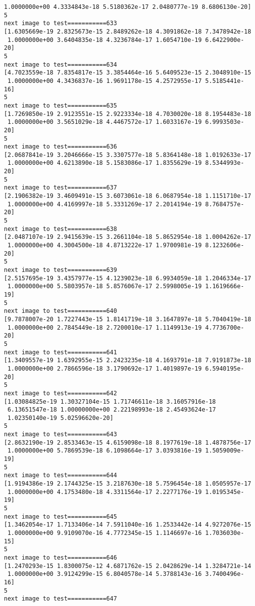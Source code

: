 \documentclass[11pt]{article}
\begin{document}
\begin{Verbatim}[commandchars=\\\{\}]
 1.0000000e+00 4.3334843e-18 5.5180362e-17 2.0480777e-19 8.6806130e-20]
5
next image to test===========633
[1.6305669e-19 2.8325673e-15 2.8489262e-18 4.3091862e-18 7.3478942e-18
 1.0000000e+00 3.6404835e-18 4.3236784e-17 1.6054710e-19 6.6422900e-20]
5
next image to test===========634
[4.7023559e-18 7.8354817e-15 3.3854464e-16 5.6409523e-15 2.3048910e-15
 1.0000000e+00 4.3436837e-16 1.9691178e-15 4.2572955e-17 5.5185441e-16]
5
next image to test===========635
[1.7269850e-19 2.9123551e-15 2.9223334e-18 4.7030020e-18 8.1954483e-18
 1.0000000e+00 3.5651029e-18 4.4467572e-17 1.6033167e-19 6.9993503e-20]
5
next image to test===========636
[2.0687841e-19 3.2046666e-15 3.3307577e-18 5.8364148e-18 1.0192633e-17
 1.0000000e+00 4.6213890e-18 5.1583086e-17 1.8355629e-19 8.5344993e-20]
5
next image to test===========637
[2.1906382e-19 3.4609491e-15 3.6073061e-18 6.0687954e-18 1.1151710e-17
 1.0000000e+00 4.4169997e-18 5.3331269e-17 2.2014194e-19 8.7684757e-20]
5
next image to test===========638
[2.0487107e-19 2.9415639e-15 3.2661104e-18 5.8652954e-18 1.0004262e-17
 1.0000000e+00 4.3004500e-18 4.8713222e-17 1.9700981e-19 8.1232606e-20]
5
next image to test===========639
[2.5157695e-19 3.4357977e-15 4.1239023e-18 6.9934059e-18 1.2046334e-17
 1.0000000e+00 5.5803957e-18 5.8576067e-17 2.5998005e-19 1.1619666e-19]
5
next image to test===========640
[9.7878007e-20 1.7227443e-15 1.8141719e-18 3.1647897e-18 5.7040419e-18
 1.0000000e+00 2.7845449e-18 2.7200010e-17 1.1149913e-19 4.7736700e-20]
5
next image to test===========641
[1.3409557e-19 1.6392955e-15 2.2423235e-18 4.1693791e-18 7.9191873e-18
 1.0000000e+00 2.7866596e-18 3.1790692e-17 1.4019897e-19 6.5940195e-20]
5
next image to test===========642
[1.03084825e-19 1.30327104e-15 1.71746611e-18 3.16057916e-18
 6.13651547e-18 1.00000000e+00 2.22198993e-18 2.45493624e-17
 1.02350140e-19 5.02596620e-20]
5
next image to test===========643
[2.8632190e-19 2.8533463e-15 4.6159098e-18 8.1977619e-18 1.4878756e-17
 1.0000000e+00 5.7869539e-18 6.1098664e-17 3.0393816e-19 1.5059009e-19]
5
next image to test===========644
[1.9194386e-19 2.1744325e-15 3.2187630e-18 5.7596454e-18 1.0505957e-17
 1.0000000e+00 4.1753480e-18 4.3311564e-17 2.2277176e-19 1.0195345e-19]
5
next image to test===========645
[1.3462054e-17 1.7133406e-14 7.5911040e-16 1.2533442e-14 4.9272076e-15
 1.0000000e+00 9.9109070e-16 4.7772345e-15 1.1146697e-16 1.7036030e-15]
5
next image to test===========646
[1.2470293e-15 1.8300075e-12 4.6871762e-15 2.0428629e-14 1.3284721e-14
 1.0000000e+00 3.9124299e-15 6.8040578e-14 5.3788143e-16 3.7400496e-16]
5
next image to test===========647

\end{Verbatim}
\end{document}
